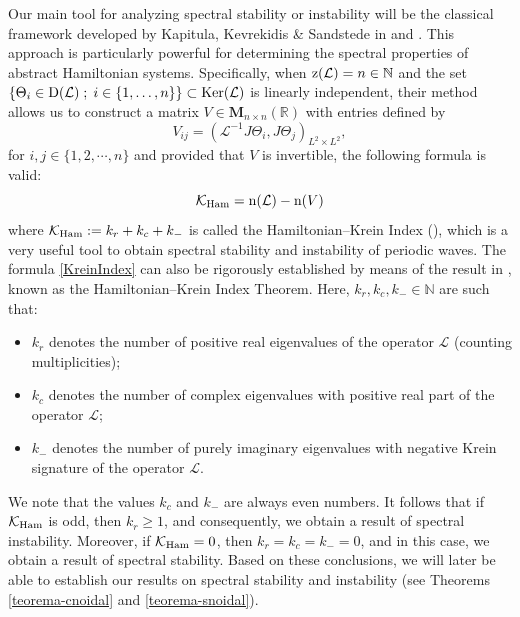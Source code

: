\documentclass[10pt,reqno,a4paper]{amsart} %
\theoremstyle{definition} %
\numberwithin{equation}{section}
\numberwithin{figure}{section}
\begin{document}
Our main tool for analyzing spectral stability or instability will be the classical framework developed by Kapitula, Kevrekidis \&  Sandstede in \cite{KapitulaKevrekidisSandstedeI} and \cite{KapitulaKevrekidisSandstedeII}. This approach is particularly powerful for determining the spectral properties of abstract Hamiltonian systems. Specifically, when ${\rm z}(\mathcal{L}) = n \in \mathbb{N}$ and the set $\{ \Theta_i \in {\rm D}(\mathcal{L}) \; ; \; i \in \{1,\ldots,n\}\} \subset {\rm Ker}(\mathcal{L})$ is linearly independent, their method allows us to construct a matrix $V \in \mathbf{M}_{n \times n}(\mathbb{R})$ with entries defined by
\begin{equation}\label{Ventries}
V_{ij}=( \mathcal{L}^{-1} J \Theta_i, J \Theta_j )_{L^2 \times L^2},
\end{equation}
for $i,j \in \{1,2,\cdots,n\}$ and provided that $V$ is invertible,  the following formula is valid:
\begin{equation}\label{KreinIndex}
 \mathcal{K_{\rm Ham}}=\text{n}(\mathcal{L}) - \text{n}(V) 
\end{equation}
where $ \mathcal{K_{\rm Ham}}:=k_r + k_c + k_{-}$ is called the Hamiltonian--Krein Index (\cite[Definition 7.1.4]{KapitulaPromislow}), which is a very useful tool to obtain spectral stability and instability of periodic waves. The formula \eqref{KreinIndex} can also be rigorously established by means of the result in \cite[Theorem 7.1.5]{KapitulaPromislow}, known as the Hamiltonian--Krein Index Theorem. Here, $k_r, k_c, k_{-} \in \mathbb{N}$ are such that:
\begin{itemize}
    \item $k_r$ denotes the number of positive real eigenvalues of the operator $\mathcal{L}$ (counting multiplicities);
    \item $k_c$ denotes the number of complex eigenvalues with positive real part of the operator $\mathcal{L}$;
    \item $k_{-}$ denotes the number of purely imaginary eigenvalues with negative Krein signature of the operator $\mathcal{L}$.
\end{itemize}
We note that the values $k_c$ and $k_{-}$ are always even numbers. It follows that if $\mathcal{K_{\rm Ham}}$ is odd, then $k_r \geq 1$, and consequently, we obtain a result of spectral instability. Moreover, if $\mathcal{K_{\rm Ham}} = 0$, then $k_r = k_c = k_{-} = 0$, and in this case, we obtain a result of spectral stability. Based on these conclusions, we will later be able to establish our results on spectral stability and instability (see Theorems \ref{teorema-cnoidal} and \ref{teorema-snoidal}).
\end{document}
